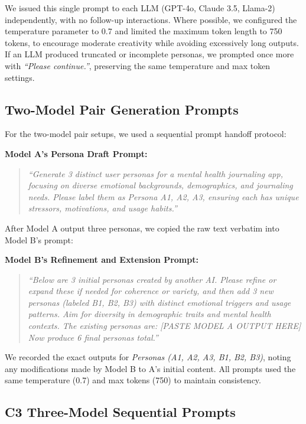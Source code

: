 \documentclass[acmsmall]{acmart}
\begin{document}
We issued this single prompt to each LLM (GPT-4o, Claude 3.5, Llama-2) independently, with no follow-up interactions. 
Where possible, we configured the temperature parameter to 0.7 and limited the maximum token length to 750 tokens, to encourage moderate creativity while avoiding excessively long outputs. 
If an LLM produced truncated or incomplete personas, we prompted once more with \emph{``Please continue.''}, preserving the same temperature and max token settings.

\subsection{Two-Model Pair Generation Prompts}

For the two-model pair setups, we used a sequential prompt handoff protocol:

\noindent\textbf{Model A’s Persona Draft Prompt:}
\begin{quote}
\emph{``Generate 3 distinct user personas for a mental health journaling app, focusing on diverse emotional backgrounds, 
demographics, and journaling needs. 
Please label them as Persona A1, A2, A3, ensuring each has unique stressors, motivations, and usage habits.''}
\end{quote}

After Model A output three personas, we copied the raw text verbatim into Model B’s prompt:

\noindent\textbf{Model B's Refinement and Extension Prompt:}
\begin{quote}
\emph{``Below are 3 initial personas created by another AI. 
Please refine or expand these if needed for coherence or variety, 
and then add 3 new personas (labeled B1, B2, B3) with distinct emotional triggers and usage patterns. 
Aim for diversity in demographic traits and mental health contexts. 
The existing personas are:
[PASTE MODEL A OUTPUT HERE]
Now produce 6 final personas total.''}
\end{quote}

We recorded the exact outputs for \emph{Personas (A1, A2, A3, B1, B2, B3)}, noting any modifications made by Model B to A's initial content. 
All prompts used the same temperature (0.7) and max tokens (750) to maintain consistency.

\subsection{C3 Three-Model Sequential Prompts} 
\end{document}

